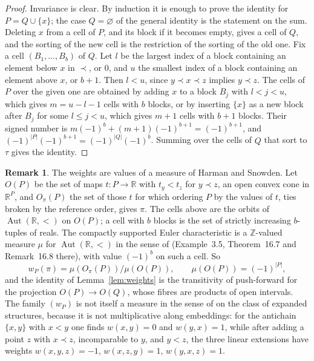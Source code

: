 \documentclass[11pt,a4paper]{article}
\theoremstyle{definition}
\newtheorem{remark}[theorem]{Remark}
\newcommand{\Z}{\mathbb{Z}}
\newcommand{\R}{\mathbb{R}}
\newcommand{\Aut}{\operatorname{Aut}}
\begin{document}
\begin{proof}
Invariance is clear. By induction it is enough to prove the identity for
$P=Q\cup\{x\}$; the case $Q=\varnothing$ of the general identity is the
statement on the sum. Deleting $x$ from a cell of $P$, and its block if it
becomes empty, gives a cell of $Q$, and the sorting of the new cell is the
restriction of the sorting of the old one. Fix a cell $(B_1,\dots,B_b)$ of
$Q$. Let $l$ be the largest index of a block containing an element below
$x$ in $\prec$, or $0$, and $u$ the smallest index of a block containing an
element above $x$, or $b+1$. Then $l<u$, since $y\prec x\prec z$ implies
$y\prec z$. The cells of $P$ over the given one are obtained by adding $x$
to a block $B_j$ with $l<j<u$, which gives $m=u-l-1$ cells with $b$ blocks,
or by inserting $\{x\}$ as a new block after $B_j$ for some $l\le j<u$,
which gives $m+1$ cells with $b+1$ blocks. Their signed number is
$m(-1)^b+(m+1)(-1)^{b+1}=(-1)^{b+1}$, and
$(-1)^{|P|}(-1)^{b+1}=(-1)^{|Q|}(-1)^b$. Summing over the cells of $Q$ that
sort to $\tau$ gives the identity.
\end{proof}

\begin{remark}\label{rem:HS}
The weights are values of a measure of Harman and Snowden. Let $O(P)$ be
the set of maps $t\colon P\to\R$ with $t_y<t_z$ for $y\prec z$, an open
convex cone in $\R^P$, and $O_\pi(P)$ the set of those $t$ for which
ordering $P$ by the values of $t$, ties broken by the reference order,
gives $\pi$. The cells above are the orbits of $\Aut(\R,<)$ on $O(P)$; a
cell with $b$ blocks is the set of strictly increasing $b$-tuples of reals.
The compactly supported Euler characteristic is a $\Z$-valued measure
$\mu$ for $\Aut(\R,<)$ in the sense of \cite{HS} (Example~3.5,
Theorem~16.7 and Remark~16.8 there), with value $(-1)^b$ on such a cell. So
\[
 w_P(\pi)=\mu(O_\pi(P))/\mu(O(P)),\qquad\mu(O(P))=(-1)^{|P|},
\]
and the identity of Lemma~\ref{lem:weights} is the transitivity of
push-forward \cite[Proposition~4.8]{HS} for the projection
$O(P)\to O(Q)$, whose fibres are products of open intervals. The family
$(w_P)$ is not itself a measure in the sense of \cite{HS} on the class of
expanded structures, because it is not multiplicative along embeddings: for
the antichain $\{x,y\}$ with $x<y$ one finds $w(x,y)=0$ and $w(y,x)=1$,
while after adding a point $z$ with $x\prec z$, incomparable to $y$, and
$y<z$, the three linear extensions have weights $w(x,y,z)=-1$,
$w(x,z,y)=1$, $w(y,x,z)=1$.
\end{remark}
\end{document}
